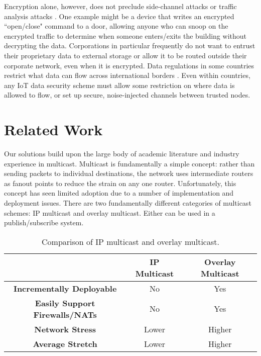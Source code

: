 Encryption alone, however, does not preclude side-channel attacks or traffic analysis attacks \cite{sidechannel}.  One example might be a device that writes an encrypted ``open/close" command to a door, allowing anyone who can snoop on the encrypted traffic to determine when someone enters/exits the building without decrypting the data.  Corporations in particular frequently do not want to entrust their proprietary data to external storage or allow it to be routed outside their corporate network, even when it is encrypted.  Data regulations in some countries restrict what data can flow across international borders \cite{itif}. Even within countries, any IoT data security scheme must allow some restriction on where data is allowed to flow, or set up secure, noise-injected channels between trusted nodes.

\section{Related Work}

Our solutions build upon the large body of academic literature and industry experience in multicast. Multicast is fundamentally a simple concept: rather than sending packets to individual destinations, the network uses intermediate routers as fanout points to reduce the strain on any one router. Unfortunately, this concept has seen limited adoption due to a number of implementation and deployment issues. There are two fundamentally different categories of multicast schemes: IP multicast and overlay multicast. Either can be used in a publish/subscribe system.

\begin{table}
	\begin{center}
		\begin{tabular}{|c|c|c|}
			\hline
			 & \textbf{IP Multicast} & \textbf{Overlay Multicast} \\
			\hline
			\textbf{Incrementally Deployable} & No & Yes \\
			\hline
			\textbf{Easily Support Firewalls/NATs} & No & Yes \\
			\hline
			\textbf{Network Stress} & Lower & Higher \\
			\hline
			\textbf{Average Stretch} & Lower & Higher \\
			\hline
		\end{tabular}
	\end{center}
	\caption{Comparison of IP multicast and overlay multicast.}
\end{table}


